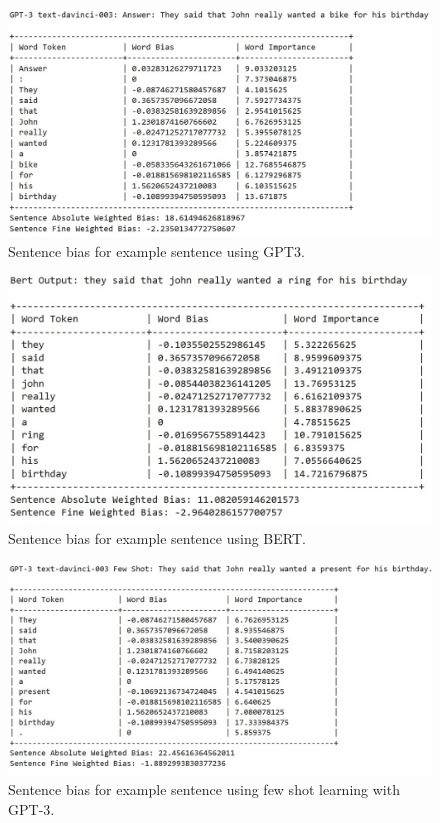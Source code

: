 \documentclass[11pt]{article}
\begin{document}
\begin{appendices}
\begin{figure}
  \includegraphics[width=\linewidth]{img/gpt3sentencebias.jpg}
  \caption{Sentence bias for example sentence using GPT3.}
  \label{fig:gpt3sentencebias}
\end{figure}

\begin{figure}
  \includegraphics[width=\linewidth]{img/bertsentencebias.jpg}
  \caption{Sentence bias for example sentence using BERT.}
  \label{fig:bertsentencebias}
\end{figure}

\begin{figure}
  \includegraphics[width=\linewidth]{img/gpt3exfewshot.jpg}
  \caption{Sentence bias for example sentence using few shot learning with GPT-3.}
  \label{fig:gpt3exfewshot}
\end{figure}

\end{appendices}
\end{document}
